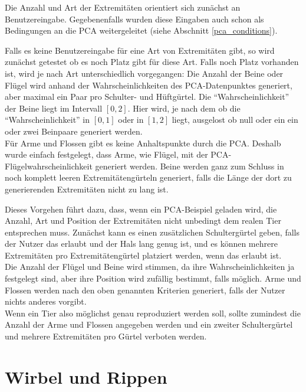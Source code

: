 Die Anzahl und Art der Extremitäten orientiert sich zunächst an Benutzereingabe. Gegebenenfalls wurden diese Eingaben auch schon als Bedingungen an die PCA weitergeleitet (siehe Abschnitt \ref{pca_conditions}).

Falls es keine Benutzereingabe für eine Art von Extremitäten gibt, so wird zunächst getestet ob es noch Platz gibt für diese Art. Falls noch Platz vorhanden ist, wird je nach Art unterschiedlich vorgegangen:
Die Anzahl der Beine oder Flügel wird anhand der Wahrscheinlichkeiten des PCA-Datenpunktes generiert, aber maximal ein Paar pro Schulter- und Hüftgürtel. Die "`Wahrscheinlichkeit"' der Beine liegt im Intervall $[0, 2]$. Hier wird, je nach dem ob die "`Wahrscheinlichkeit"' in $[0, 1]$ oder in $[1, 2]$ liegt, ausgelost ob null oder ein \bzw ein oder zwei Beinpaare generiert werden.\\
Für Arme und Flossen gibt es keine Anhaltspunkte durch die PCA. Deshalb wurde einfach festgelegt, dass Arme, wie Flügel, mit der PCA-Flügelwahrscheinlichkeit generiert werden. Beine werden ganz zum Schluss in noch komplett leeren Extremitätengürteln generiert, falls die Länge der dort zu generierenden Extremitäten nicht zu lang ist.


Dieses Vorgehen führt dazu, dass, wenn ein PCA-Beispiel geladen wird, die Anzahl, Art und Position der Extremitäten nicht unbedingt dem realen Tier entsprechen muss.
Zunächst kann es einen zusätzlichen Schultergürtel geben, falls der Nutzer das erlaubt und der Hals lang genug ist, und es können mehrere Extremitäten pro Extremitätengürtel platziert werden, wenn das erlaubt ist.\\
Die Anzahl der Flügel und Beine wird stimmen, da ihre Wahrscheinlichkeiten ja festgelegt sind, aber ihre Position wird zufällig bestimmt, falls möglich.  Arme und Flossen werden nach den oben genannten Kriterien generiert, falls der Nutzer nichts anderes vorgibt.\\
Wenn ein Tier also möglichst genau reproduziert werden soll, sollte zumindest die Anzahl der Arme und Flossen angegeben werden und ein zweiter Schultergürtel und mehrere Extremitäten pro Gürtel verboten werden.


\section{Wirbel und Rippen}
\label{section:vertebrae_ribs}

